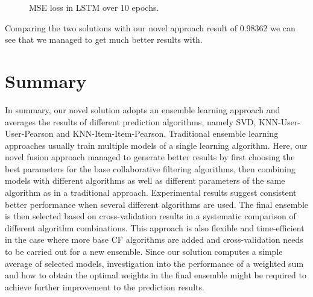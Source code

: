\documentclass[10pt,conference,compsocconf]{IEEEtran}
\begin{document}
\begin{figure}[tbp]
\centering
{}
\caption{MSE loss in LSTM over 10 epochs.}
\label{fig:lstm}
\end{figure}

Comparing the two solutions with our novel approach result of 0.98362 we can see that we managed to get much better results with.

\section{Summary}
In summary, our novel solution adopts an ensemble learning approach and averages the results of different prediction algorithms, namely SVD, KNN-User-User-Pearson and KNN-Item-Item-Pearson. Traditional ensemble learning approaches usually train multiple models of a single learning algorithm. Here, our novel fusion approach managed to generate better results by first choosing the best parameters for the base collaborative filtering algorithms, then combining models with different algorithms as well as different parameters of the same algorithm as in a traditional approach. Experimental results suggest consistent better performance when several different algorithms are used. The final ensemble is then selected based on  cross-validation results in a systematic comparison of different algorithm combinations. 
This approach is also flexible and time-efficient in the case where more base CF algorithms are added and cross-validation needs to be carried out for a new ensemble. 
Since our solution computes a simple average of selected models, investigation into the performance of a weighted sum and how to obtain the optimal weights in the final ensemble might be required to achieve further improvement to the prediction results.

\nocite{*}


\end{document}
